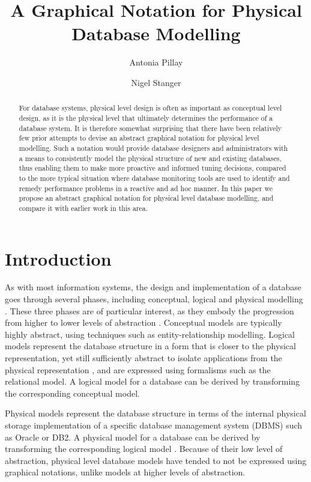 \documentclass{CRPITStyle}
\title{A Graphical Notation for Physical Database Modelling}
\author{Antonia Pillay \and Nigel Stanger}
\affiliation{Department of Information Science, \\
	University of Otago, \\
	PO Box 56, Dunedin, New Zealand \\
	Email:~\texttt{nstanger@infoscience.otago.ac.nz}}
\begin{document}
\maketitle


\begin{abstract}
For database systems, physical level design is often as important as
conceptual level design, as it is the physical level that ultimately
determines the performance of a database system. It is therefore
somewhat surprising that there have been relatively few prior attempts
to devise an abstract graphical notation for physical level modelling.
Such a notation would provide database designers and administrators with
a means to consistently model the physical structure of new and existing
databases, thus enabling them to make more proactive and informed tuning
decisions, compared to the more typical situation where database
monitoring tools are used to identify and remedy performance problems in
a reactive and ad hoc manner. In this paper we propose an abstract
graphical notation for physical level database modelling, and compare it
with earlier work in this area.
\end{abstract}


\section{Introduction}

As with most information systems, the design and implementation of a
database goes through several phases, including conceptual, logical and
physical modelling \cite{BeDa-P-2003}. These three phases are of
particular interest, as they embody the progression from higher to lower
levels of abstraction \cite{Tsic-D-1978}. Conceptual models are
typically highly abstract, using techniques such as entity-relationship
modelling. Logical models represent the database structure in a form
that is closer to the physical representation, yet still sufficiently
abstract to isolate applications from the physical representation
\cite{Codd-EF-1970}, and are expressed using formalisms such as the
relational model. A logical model for a database can be derived by
transforming the corresponding conceptual model.

Physical models represent the database structure in terms of the
internal physical storage implementation of a specific database
management system (DBMS) such as Oracle or DB2. A physical model for a
database can be derived by transforming the corresponding logical model
\cite{Bato-DS-1985,Conn-TM-2002}. Because of their low level of
abstraction, physical level database models have tended to not be
expressed using graphical notations, unlike models at higher levels of
abstraction.
\end{document}
